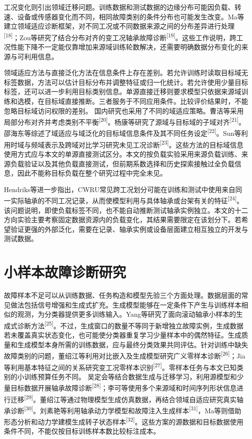 \documentclass[UTF8,12pt,openany,twoside]{ctexbook}
\numberwithin{equation}{chapter}
\begin{document}
工况变化则引出领域迁移问题。训练数据和测试数据的边缘分布可能因负载、转速、设备或传感器变化而不同，相同故障类别的条件分布也可能发生改变。Ma等建立领域适应诊断框架，对不同工况或不同数据来源之间的分布差异进行处理\textsuperscript{[18]}；Zou等研究了结合分布对齐的变工况轴承故障诊断\textsuperscript{[19]}。这些工作说明，跨工况性能下降不一定能仅靠增加来源域训练轮数解决，还需要明确数据分布变化的来源与可利用信息。

领域适应方法与直接泛化方法在信息条件上存在差别。若允许训练时读取目标域无标签数据，方法可以估计目标分布并调整特征或归一化统计。若允许使用少量目标标签，还可以进一步利用目标类别信息。单源直接迁移则要求模型只依据来源域训练和选模，在目标域直接推断。三者服务于不同应用条件。比较评价结果时，不能忽略目标域访问权限的差别。 国内研究也采用了不同的域适应策略。曹洁等采用局部分布对齐并考虑类别不平衡\textsuperscript{[20]}。杨康等研究了源域与目标域的子域对齐\textsuperscript{[21]}。邵海东等综述了域适应与域泛化的目标域信息条件及其不同任务设定\textsuperscript{[22]}。Sun等利用时域与频域表示及跨域对比学习研究未见工况诊断\textsuperscript{[23]}。这些方法的目标域信息使用方式应与本文的单源直接测试区分。本文的按负载实验采用来源负载训练、来源负载验证以及其他负载直接测试，但前期系数选择和历史探索接触过全负载信息，因此不能称目标负载在整个研究过程中完全未见。

Hendriks等进一步指出，CWRU常见跨工况划分可能在训练和测试中使用来自同一实际轴承的不同工况记录，从而使模型利用与具体轴承或台架有关的特征\textsuperscript{[24]}。该问题说明，即使负载标签不同，也不能自动推断测试轴承实例独立。本文的十二方向实验主要考察固定数据资源内的负载变化，其结果需要限定在该划分下。若希望验证更强的外部泛化，需要在记录、轴承实例或设备层面建立相互独立的开发与测试数据。

\section{小样本故障诊断研究}\label{ux5c0fux6837ux672cux6545ux969cux8bcaux65adux7814ux7a76}

故障样本不足可以从训练数据、任务构造和模型先验三个方面处理。数据层面的常见做法包括信号增强和生成式扩充。生成模型能够在一定条件下产生与训练样本相似的观测，为分类器提供更多训练输入。Yang等研究了面向滚动轴承小样本的生成式诊断方法\textsuperscript{[25]}。不过，生成窗口的数量不等同于新增独立故障实例，生成数据若未覆盖真实状态变化，也可能使分类器重复学习少量样本中的偶然特征。生成质量和生成模型本身所需的训练数据，应与最终分类效果共同评估。针对训练中缺失故障类别的问题，董绍江等利用对比嵌入及生成模型研究广义零样本诊断\textsuperscript{[26]}；Jia等利用基本特征之间的关系研究变工况零样本识别\textsuperscript{[27]}。零样本任务与本文已知类别的小训练预算任务不同。 吴定会等结合数据生成与迁移学习，利用源模型和少量目标数据开展轴承故障诊断\textsuperscript{[28]}；李可等使用多个来源域和时间序列形状信息进行迁移\textsuperscript{[29]}。董绍江等通过物理模型生成仿真数据，再结合领域自适应研究真实轴承诊断\textsuperscript{[30]}。刘素艳等利用轴承动力学模型和故障注入生成样本\textsuperscript{[31]}，Ma等则借助形态分析和动力学建模生成转子状态样本\textsuperscript{[32]}。这些方案的源数据和目标数据使用条件不同，不能仅按目标训练样本数比较标注成本。
\end{document}
